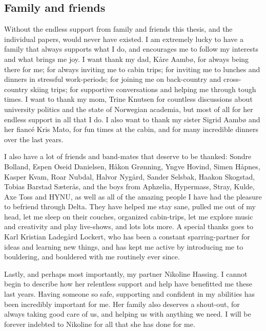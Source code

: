 \subsection*{Family and friends}

Without the endless support from family and friends this thesis, and the individual papers, would never have existed. I am extremely lucky to have a family that always supports what I do, and encourages me to follow my interests and what brings me joy. I want thank my dad, Kåre Aambø, for always being there for me; for always inviting me to cabin trips; for inviting me to lunches and dinners in stressful work-periods; for joining me on back-country and cross-country skiing trips; for supportive conversations and helping me through tough times. I want to thank my mom, Trine Knutsen for countless discussions about university politics and the state of Norwegian academia, but most of all for her endless support in all that I do. I also want to thank my sister Sigrid Aambø and her fiancé Kris Mato, for fun times at the cabin, and for many incredible dinners over the last years. 

I also have a lot of friends and band-mates that deserve to be thanked: Sondre Bolland, Espen Oseid Danielsen, Håkon Grønning, Yngve Hovind, Simen Håpnes, Kasper Kvam, Roar Nubdal, Halvor Nygård, Sander Selsbak, Haakon Skogstad, Tobias Barstad Sæterås, and the boys from Aphzelia, Hypermass, Stray, Kulde, Axe Toss and HYNU, as well as all of the amazing people I have had the pleasure to befriend through Delta. They have helped me stay sane, pulled me out of my head, let me sleep on their couches, organized cabin-trips, let me explore music and creativity and play live-shows, and lots lots more. A special thanks goes to Karl Kristian Ladegård Lockert, who has been a constant sparring-partner for ideas and learning new things, and has kept me active by introducing me to bouldering, and bouldered with me routinely ever since. 

Lastly, and perhaps most importantly, my partner Nikoline Hassing. I cannot begin to describe how her relentless support and help have benefitted me these last years. Having someone so safe, supporting and confident in my abilities has been incredibly important for me. Her family also deserves a shout-out, for always taking good care of us, and helping us with anything we need. I will be forever indebted to Nikoline for all that she has done for me. 


